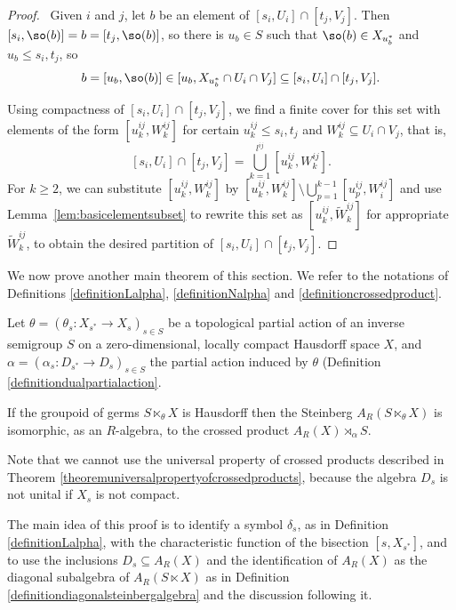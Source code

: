 \begin{proof}\
Given $i$ and $j$, let $b$ be an element of $[s_i,U_i]\cap[t_j,V_j]$. Then $[s_i,\so(b)]=b=[t_j,\so(b)]$, so there is $u_b \in S$ such that $\so(b)\in X_{u_b^*}$ and $u_b\leq s_i,t_j$, so
\[b=[u_b,\so(b)]\in[u_b,X_{u_b^*}\cap U_i\cap V_j]\subseteq[s_i,U_i]\cap[t_j,V_j].\]

Using compactness of $[s_i,U_i]\cap[t_j,V_j]$, we find a finite cover for this set with elements of the form $ \left[u_k^{ij},W^{ij}_k\right]$ for certain $u^{ij}_k\leq s_i,t_j$ and $W^{ij}_k\subseteq U_i\cap V_j$, that is,
\[\left[s_i,U_i\right]\cap\left[t_j,V_j\right] = \bigcup_{k=1}^{l^{ij}} \left[u_k^{ij},W^{ij}_k\right].\]
For $k\geq 2$, we can substitute $\left[u_k^{ij},W^{ij}_k\right]$ by $\left[u_k^{ij},W^{ij}_k\right]\setminus\bigcup_{p=1}^{k-1} \left[u_p^{ij},W^{ij}_i\right]$ and use Lemma~\ref{lem:basicelementsubset} to rewrite this set as $[u_k^{ij},\widetilde{W}_k^{ij}]$ for appropriate $\widetilde{W}_k^{ij}$, to obtain the desired partition of $[s_i,U_i]\cap[t_j,V_j]$.\qedhere
\end{proof}

We now prove another main theorem of this section. We refer to the notations of Definitions \ref{definitionLalpha}, \ref{definitionNalpha} and \ref{definitioncrossedproduct}.

\begin{theorem}\label{theoremsteinbergiscrossed}
Let $\theta=\left(\theta_s:X_{s^*}\to X_s\right)_{s\in S}$ be a topological partial action of an inverse semigroup $S$ on a zero-dimensional, locally compact Hausdorff space $X$, and $\alpha=\left(\alpha_s:D_{s^*}\to D_s\right)_{s\in S}$ the partial action induced by $\theta$ (Definition \ref{definitiondualpartialaction}.%

If the groupoid of germs $S \ltimes_\theta X$ is Hausdorff then the Steinberg $A_R(S \ltimes_\theta X)$ is isomorphic, as an $R$-algebra, to the crossed product $A_R(X) \rtimes_\alpha S$.
\end{theorem}

Note that we cannot use the universal property of crossed products described in Theorem \ref{theoremuniversalpropertyofcrossedproducts}, because the algebra $D_s$ is not unital if $X_s$ is not compact.

The main idea of this proof is to identify a symbol $\delta_s$, as in Definition \ref{definitionLalpha}, with the characteristic function of the bisection $[s,X_{s^*}]$, and to use the inclusions $D_s\subseteq A_R(X)$ and the identification of $A_R(X)$ as the diagonal subalgebra of $A_R(S\ltimes X)$ as in Definition \ref{definitiondiagonalsteinbergalgebra} and the discussion following it.

